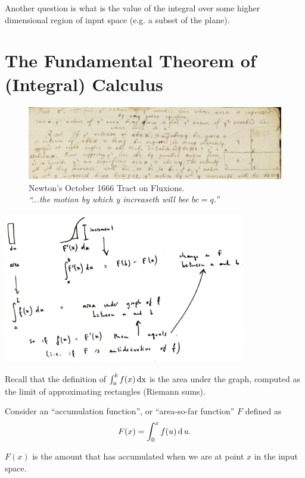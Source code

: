 Another question is what is the value of the integral over some higher
dimensional region of input space (e.g. a subset of the plane).

\newpage
\section{The Fundamental Theorem of (Integral) Calculus}

\begin{figure}[h]
\centering
\includegraphics[width=500pt]{img/newton-october-1666-tract-ftc.png}
\captionsetup{labelformat=empty,justification=centering}
\caption[xxx]{Newton's October 1666 Tract on Fluxions.\\
  \emph{``...the motion by which y increaseth will bee $bc = q$.''}}
\end{figure}

\includegraphics[width=300pt]{img/ftc.png}

Recall that the definition of $\int_a^b f(x) \operatorname{\text{dx}}$ is the area under the graph,
computed as the limit of approximating rectangles (Riemann sums).

Consider an ``accumulation function'', or ``area-so-far function'' $F$ defined
as
\begin{align*}
  F(x) = \int_0^x f(u) \operatorname{\text{d}} u.
\end{align*}

$F(x)$ is the amount that has accumulated when we are at point $x$ in the
input space.

